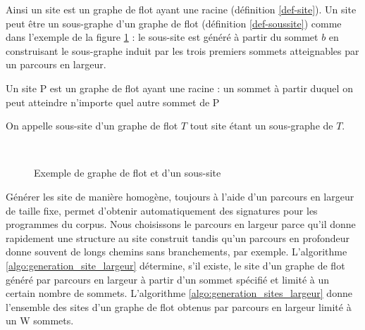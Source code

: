 Ainsi un site est un graphe de flot ayant une racine (définition \ref{def-site}). Un site peut être un sous-graphe d'un graphe de flot (définition \ref{def-soussite}) comme dans l'exemple de la figure \ref{fig:ex-gf-site} : le sous-site est généré à partir du sommet $b$ en construisant le sous-graphe induit par les trois premiers sommets atteignables par un parcours en largeur.

\begin{defi}\label{def-site}
Un site P est un graphe de flot ayant une racine : un sommet à partir duquel on peut atteindre n'importe quel autre sommet de P
\end{defi}

\begin{defi}\label{def-soussite}
On appelle sous-site d'un graphe de flot $T$ tout site étant un sous-graphe de $T$.
\end{defi}

\begin{figure}[ht]
\begin{center}
  \subfigure[Graphe de flot T]{
\label{fig:ex-gf}
\texttt{[image: supports/algos/gTGF\_circo\_cropped0.pdf]}
}\quad
  \subfigure[Site P, de racine b, isomorphe à un sous-graphe de T]{
\label{fig:ex-site}
\texttt{[image: supports/algos/gPsite\_circo\_cropped0.pdf]}
}\\
\end{center}
\caption{Exemple de graphe de flot et d'un sous-site}
\label{fig:ex-gf-site}
\end{figure}

Générer les site de manière homogène, toujours à l'aide d'un parcours en largeur de taille fixe, permet d'obtenir automatiquement des signatures pour les programmes du corpus.
Nous choisissons le parcours en largeur parce qu'il donne rapidement une structure au site construit tandis qu'un parcours en profondeur donne souvent de longs chemins sans branchements, par exemple.
L'algorithme \ref{algo:generation_site_largeur} détermine, s'il existe, le site d'un graphe de flot généré par parcours en largeur à partir d'un sommet spécifié et limité à un certain nombre de sommets. L'algorithme \ref{algo:generation_sites_largeur} donne l'ensemble des sites d'un graphe de flot obtenus par parcours en largeur limité à un W sommets.

